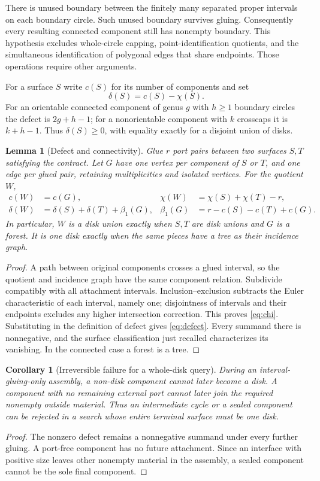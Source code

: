 \documentclass[11pt,a4paper]{article}
\newtheorem{lemma}[lemma]{Lemma}
\newtheorem{corollary}[corollary]{Corollary}
\theoremstyle{definition}
\begin{document}
There is unused boundary between the finitely many separated proper intervals on each boundary circle. Such unused boundary survives gluing. Consequently every resulting connected component still has nonempty boundary. This hypothesis excludes whole-circle capping, point-identification quotients, and the simultaneous identification of polygonal edges that share endpoints. Those operations require other arguments.

For a surface $S$ write $c(S)$ for its number of components and set
\[
\delta(S)=c(S)-\chi(S).
\]
For an orientable connected component of genus $g$ with $h\ge1$ boundary circles the defect is $2g+h-1$; for a nonorientable component with $k$ crosscaps it is $k+h-1$. Thus $\delta(S)\ge0$, with equality exactly for a disjoint union of disks.

\begin{lemma}[Defect and connectivity]\label{lem:defect}
Glue $r$ port pairs between two surfaces $S,T$ satisfying the contract. Let $G$ have one vertex per component of $S$ or $T$, and one edge per glued pair, retaining multiplicities and isolated vertices. For the quotient $W$,
\begin{align}
c(W)&=c(G), & \chi(W)&=\chi(S)+\chi(T)-r,\label{eq:chi}\\
\delta(W)&=\delta(S)+\delta(T)+\beta_1(G), &
\beta_1(G)&=r-c(S)-c(T)+c(G).\label{eq:defect}
\end{align}
In particular, $W$ is a disk union exactly when $S,T$ are disk unions and $G$ is a forest. It is one disk exactly when the same pieces have a tree as their incidence graph.
\end{lemma}
\begin{proof}
A path between original components crosses a glued interval, so the quotient and incidence graph have the same component relation. Subdivide compatibly with all attachment intervals. Inclusion--exclusion subtracts the Euler characteristic of each interval, namely one; disjointness of intervals and their endpoints excludes any higher intersection correction. This proves \eqref{eq:chi}. Substituting in the definition of defect gives \eqref{eq:defect}. Every summand there is nonnegative, and the surface classification just recalled characterizes its vanishing. In the connected case a forest is a tree.
\end{proof}

\begin{corollary}[Irreversible failure for a whole-disk query]\label{cor:irreversible}
During an interval-gluing-only assembly, a non-disk component cannot later become a disk. A component with no remaining external port cannot later join the required nonempty outside material. Thus an intermediate cycle or a sealed component can be rejected in a search whose \emph{entire} terminal surface must be one disk.
\end{corollary}
\begin{proof}
The nonzero defect remains a nonnegative summand under every further gluing. A port-free component has no future attachment. Since an interface with positive size leaves other nonempty material in the assembly, a sealed component cannot be the sole final component.
\end{proof}
\end{document}
